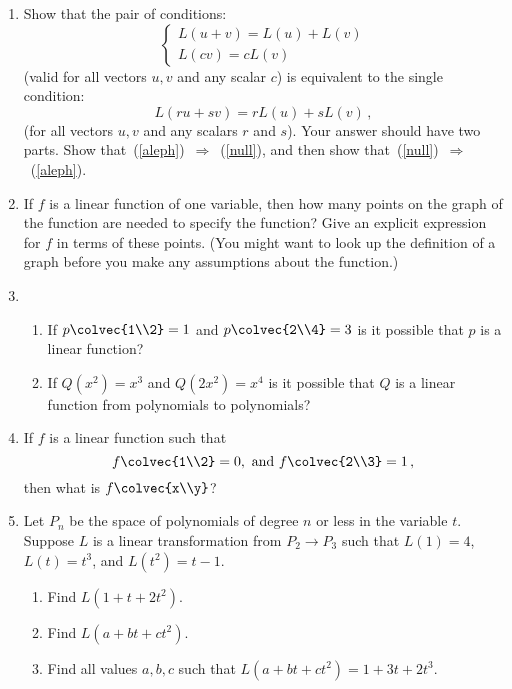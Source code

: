


\begin{enumerate}
\item Show that the pair of conditions:
\begin{equation}\label{aleph}\left\{
\begin{array}{l}L(u+v) = L(u)+L(v)\\[1mm]L(cv) = cL(v) \end{array}\right.\tag{1}
\end{equation}
(valid for all vectors $u,v$ and any scalar $c$) is equivalent to the single condition:
\begin{equation}\label{null}L(ru + sv) = rL(u) + sL(v)\, ,\tag{2}\end{equation}
(for all vectors $u,v$ and any scalars $r$ and $s$).
Your answer should have two parts.  Show that~(\ref{aleph})~$\Rightarrow$~(\ref{null}), and then show that~(\ref{null})~$\Rightarrow$~(\ref{aleph}).


\item If $f$ is a linear function of one variable, then how many points on the graph of the function are needed to specify the function? Give an explicit expression for $f$ in terms of these points. (You might want to look up the definition of a graph before you make any assumptions about the function.)

\item 
\begin{enumerate}\item If $p\colvec{1\\2}=1$ and $p\colvec{2\\4}=3$ is it possible that $p$ is a linear function? 
\item
 If $Q(x^2)=x^3$ and $Q(2x^2)=x^4$ is it possible that $Q$ is a linear function from polynomials to polynomials? 
\end{enumerate}


\item If $f$ is a linear function such that 
\[f\colvec{1\\2}=0,\text{~and~} f\colvec{2\\3}=1\, ,\] 
then what is $f\colvec{x\\y}$?


\item \label{polyprob}Let $P_n$ be the space of polynomials of degree $n$ or less in the variable $t$.  Suppose $L$ is a linear transformation from $P_2 \rightarrow P_3$ such that
$L(1) = 4$, $L(t)=t^3$, and $L(t^2) = t-1$.
\begin{enumerate}
\item Find $L(1+t+2t^2)$.
\item Find $L(a+bt+ct^2)$.
\item Find all values $a,b,c$ such that $L(a+bt+ct^2)=1+3t+2t^3$.
\end{enumerate}


\end{enumerate}
